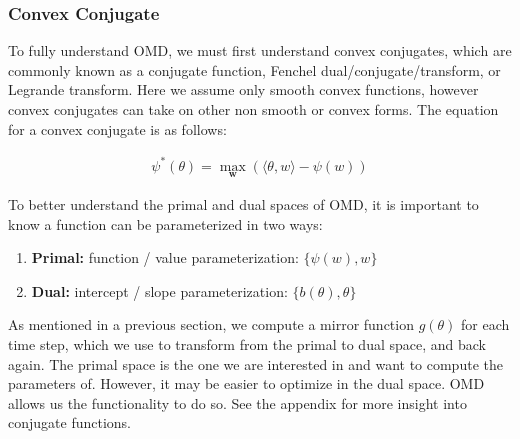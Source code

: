 \documentclass[11pt]{article}
\begin{document}
\subsubsection{Convex Conjugate}
To fully understand OMD, we must first understand convex conjugates, which are commonly known as a conjugate function, Fenchel dual/conjugate/transform, or Legrande transform. Here we assume only smooth convex functions, however convex conjugates can take on other non smooth or convex forms. The equation for a convex conjugate is as follows:


\begin{align}
\label{eq:8}
    \psi^*(\theta) = \max\limits_{\textbf{w}} (\langle \theta, w \rangle - \psi(w))
\end{align}

To better understand the primal and dual spaces of OMD, it is important to know a function can be parameterized in two ways:

\begin{enumerate}
    \item \textbf{Primal:} function / value parameterization:
    $\{\psi(w), w\}$
    \item \textbf{Dual:} intercept / slope parameterization: 
    $\{b(\theta), \theta\}$
\end{enumerate}


As mentioned in a previous section, we compute a mirror function $g(\theta)$ for each time step, which we use to transform from the primal to dual space, and back again. The primal space is the one we are interested in and want to compute the parameters of. However, it may be easier to optimize in the dual space. OMD allows us the functionality to do so. See the appendix for more insight into conjugate functions.
\end{document}
